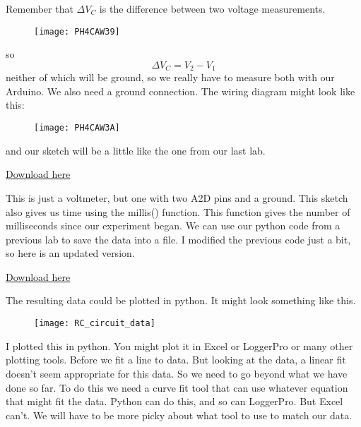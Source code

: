 Remember that $\Delta V_{C}$ is the difference between two voltage
measurements. \begin{figure}[h!]
\texttt{[image: PH4CAW39]}
\end{figure}so 
\begin{equation*}
\Delta V_{C}=V_{2}-V_{1}
\end{equation*}%
neither of which will be ground, so we really have to measure both with our
Arduino. We also need a ground connection. The wiring diagram might look
like this:\begin{figure}[h!]
\texttt{[image: PH4CAW3A]}
\end{figure}and our sketch will be a little
like the one from our last lab.


\href{https://dtoliphant.github.io/PH250Manual/Code/RC_Volts_vsTime.ino}{Download here}





This is just a voltmeter, but one with two A2D pins and a ground. This
sketch also gives us time using the millis() function. This function gives
the number of milliseconds since our experiment began. We can use our python
code from a previous lab to save the data into a file. I modified the
previous code just a bit, so here is an updated version.


\href{https://dtoliphant.github.io/PH250Manual/Code/RC_ReadSaveFile.py}{Download here}




The resulting data could be plotted in python. It might look something like this.

\begin{figure}[h!]
	\centering
	\texttt{[image: RC\_circuit\_data]}
\end{figure}

I plotted this in python. You might plot it in Excel or LoggerPro or many other plotting tools. Before we fit a line to data. But looking at the data, a linear fit doesn't seem appropriate
for this data. So we need to go beyond what we have done so far. To do this we need a curve fit tool that can use whatever equation that might fit the data. Python can do this, and so can LoggerPro.  But Excel can't. We will have to be more picky about what tool to use to match our data. 


%	

	
